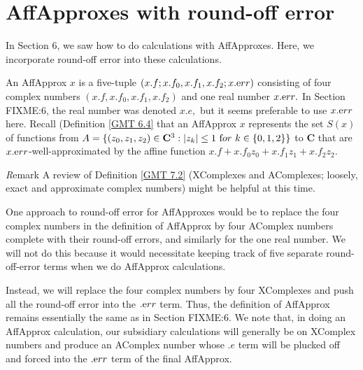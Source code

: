 \chapter{AffApproxes with round-off error}
 
In Section 6, we saw how to do calculations with AffApproxes.  Here, we incorporate round-off error into
these calculations.  

\begin{conventions}\label{GMT 8,1}
An AffApprox $x$ is a five-tuple
$(x.f; x.f_0,x.f_1,x.f_2; x.{\textrm err})$
consisting of four complex numbers $(x.f, x.f_0,x.f_1, x.f_2)$ and one real number $x.{\textrm err}.$  In Section FIXME:6, the
	real number was denoted $x.e,$ but it seems preferable to use $x.{\textrm err}$ here.  Recall (Definition \ref{GMT 6.4}
that an AffApprox $x$ represents the set $S(x)$ of functions from $A = \{(z_0,z_1,z_2) \in {\mathbf C}^3 : |z_k| \le 1 \
{\textrm for} \ k \in \{0,1,2\}\}$ to ${\mathbf C}$ that are $x.{\textrm err}$-well-approximated by the affine function
$x.f + x.f_0 z_0 + x.f_1 z_1 + x.f_2 z_2.$
\end{conventions}

{\textit Remark} \label{GMT 8.2}
A review of Definition \ref{GMT 7.2} (XComplexes and AComplexes; loosely, exact and approximate complex numbers) might be helpful at this time.

One approach to round-off error for AffApproxes would be to replace the four complex numbers in the definition of AffApprox by four AComplex numbers complete with their round-off errors, and similarly for the one real number.  We will not do this because it would necessitate keeping track of five separate round-off-error terms when we do AffApprox calculations.

Instead, we will 
replace the four complex numbers by four XComplexes and push all the round-off error into the $.{\textrm err}$ term.  
Thus, the definition of AffApprox remains 
essentially the same as in Section FIXME:6.
We note that, in doing an AffApprox calculation, our subsidiary calculations will generally be on XComplex numbers and produce an AComplex number whose $.e$ term will be plucked off and forced into the $.{\textrm err}$ term of the final AffApprox.

